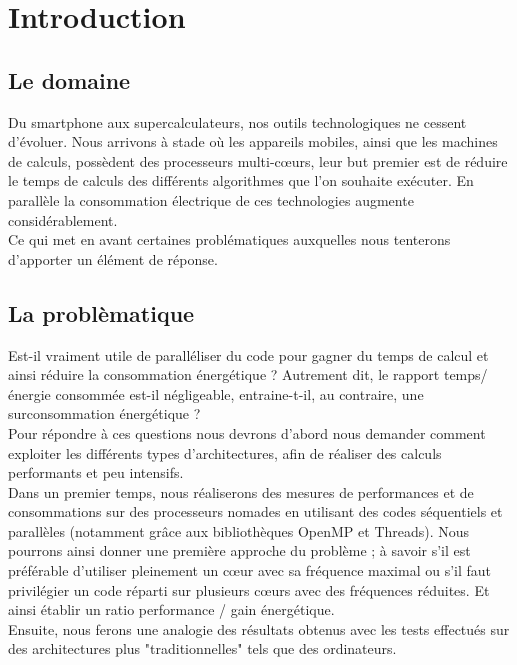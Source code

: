 \chapter{Introduction}

	\section{Le domaine}
		Du smartphone aux supercalculateurs, nos outils technologiques ne cessent d'évoluer. Nous arrivons à stade où les appareils mobiles, ainsi que les machines de calculs, possèdent des processeurs multi-c\oe{}urs, leur but premier est de réduire le temps de calculs des différents algorithmes que l'on souhaite exécuter. En parallèle la consommation électrique de ces technologies augmente considérablement. \\
 		Ce qui met en avant certaines problématiques auxquelles nous tenterons d'apporter un élément de réponse. 

	\section{La problèmatique}
		Est-il vraiment utile de paralléliser du code pour gagner du temps de calcul et ainsi réduire la consommation énergétique ? Autrement dit, le rapport temps/énergie consommée est-il négligeable, entraine-t-il, au contraire, une surconsommation énergétique ? \\

		Pour répondre à ces questions nous devrons d'abord nous demander comment exploiter les différents types d'architectures, afin de réaliser des calculs performants et peu intensifs.\\

		Dans un premier temps, nous réaliserons des mesures de performances et de consommations sur des processeurs nomades en utilisant des codes séquentiels et parallèles (notamment grâce aux bibliothèques OpenMP et Threads). Nous pourrons ainsi donner une première approche du problème ; à savoir s'il est préférable d'utiliser pleinement un c\oe{}ur avec sa fréquence maximal ou s'il faut privilégier un code réparti sur plusieurs c\oe{}urs avec des fréquences réduites. Et ainsi établir un ratio performance / gain énergétique.\\

		Ensuite, nous ferons une analogie des résultats obtenus avec les tests effectués sur des architectures plus "traditionnelles" tels que des ordinateurs.\\

